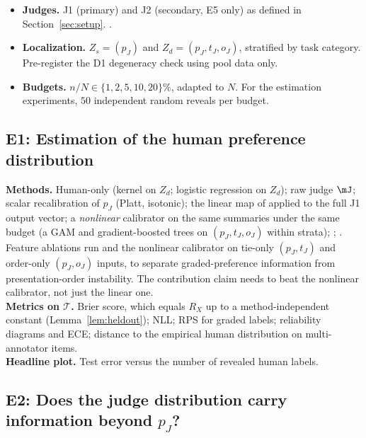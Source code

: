 \begin{itemize}
        Labels in $\mathcal G$ never enter a budgeted procedure; E2 affects only how results are
        reported and framed.
  \item \textbf{Judges.} J1 (primary) and J2 (secondary, E5 only) as defined in
        Section~\ref{sec:setup}. .
  \item \textbf{Localization.} $Z_s=(p_J)$ and $Z_d=(p_J,t_J,o_J)$, stratified by task category.
        Pre-register the D1 degeneracy check using pool data only.
  \item \textbf{Budgets.} $n/N\in\{1,2,5,10,20\}\%$, adapted to $N$. For the estimation experiments,
        $50$ independent random reveals per budget.
\end{itemize}

\subsection{E1: Estimation of the human preference distribution}

\textbf{Methods.} Human-only (kernel on $Z_d$; logistic regression on $Z_d$); raw judge $\mJ$; scalar
recalibration of $p_J$ (Platt, isotonic); the linear map of \citet{vandenburg2025aligning} applied to
the full J1 output vector; a \emph{nonlinear} calibrator on the same summaries under the same budget
(a GAM and gradient-boosted trees on $(p_J,t_J,o_J)$ within strata); \sfsp; \dfsp. Feature ablations run
\dfsp{} and the nonlinear calibrator on tie-only $(p_J,t_J)$ and order-only $(p_J,o_J)$ inputs, to
separate graded-preference information from presentation-order instability. The contribution claim
needs \dfsp{} to beat the nonlinear calibrator, not just the linear one.\\
\textbf{Metrics on $\mathcal T$.} Brier score, which equals $R_X$ up to a method-independent constant
(Lemma~\ref{lem:heldout}); NLL; RPS for graded labels; reliability diagrams and ECE; distance to the
empirical human distribution on multi-annotator items.\\
\textbf{Headline plot.} Test error versus the number of revealed human labels.

\subsection{\texorpdfstring{E2: Does the judge distribution carry information beyond $p_J$?}{E2: Does the judge distribution carry information beyond p\_J?}}

